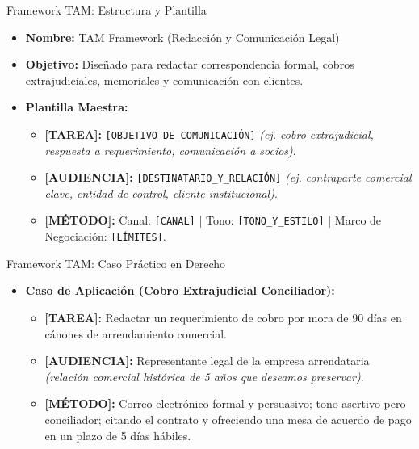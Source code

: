 \documentclass[aspectratio=169]{beamer}
\begin{document}
\begin{frame}{Framework TAM: Estructura y Plantilla}


\begin{itemize}
  \item \textbf{Nombre:} TAM Framework (Redacción y Comunicación Legal)
  \item \textbf{Objetivo:} Diseñado para redactar correspondencia formal, cobros extrajudiciales, memoriales y comunicación con clientes.
  \item \textbf{Plantilla Maestra:}
  \begin{itemize}
    \item \textbf{[TAREA]:} \texttt{[OBJETIVO\_DE\_COMUNICACIÓN]} \textit{(ej. cobro extrajudicial, respuesta a requerimiento, comunicación a socios)}.
    \item \textbf{[AUDIENCIA]:} \texttt{[DESTINATARIO\_Y\_RELACIÓN]} \textit{(ej. contraparte comercial clave, entidad de control, cliente institucional)}.
    \item \textbf{[MÉTODO]:} Canal: \texttt{[CANAL]} | Tono: \texttt{[TONO\_Y\_ESTILO]} | Marco de Negociación: \texttt{[LÍMITES]}.
  \end{itemize}
\end{itemize}
\end{frame}

\begin{frame}{Framework TAM: Caso Práctico en Derecho}


\begin{itemize}
  \item \textbf{Caso de Aplicación (Cobro Extrajudicial Conciliador):}
  \begin{itemize}
    \item \textbf{[TAREA]:} Redactar un requerimiento de cobro por mora de 90 días en cánones de arrendamiento comercial.
    \item \textbf{[AUDIENCIA]:} Representante legal de la empresa arrendataria \textit{(relación comercial histórica de 5 años que deseamos preservar)}.
    \item \textbf{[MÉTODO]:} Correo electrónico formal y persuasivo; tono asertivo pero conciliador; citando el contrato y ofreciendo una mesa de acuerdo de pago en un plazo de 5 días hábiles.
  \end{itemize}
\end{itemize}
\end{frame}
\end{document}
